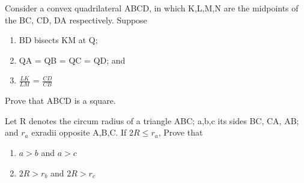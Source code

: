 \item Consider a convex quadrilateral ABCD, in which K,L,M,N are the midpoints of the BC, CD, DA respectively. Suppose
\begin{enumerate}
\item BD bisects KM at Q;
\item QA = QB = QC = QD; and
\item $\frac{LK}{LM}$ = $\frac{CD}{CB}$
\end{enumerate}
Prove that ABCD is a square.

\item Let R denotes the circum radius of a triangle ABC; a,b,c its sides BC, CA, AB; and $r_a$ exradii opposite A,B,C. If $2R \leq r_a$, Prove that 
\begin{enumerate}
\item $a > b$ and $a > c$
\item $2R > r_b$ and $2R > r_c$
\end{enumerate}






















